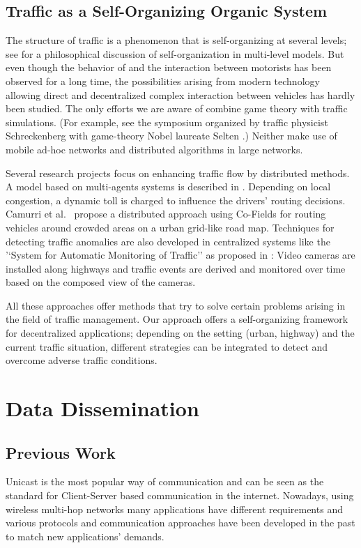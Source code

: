 \documentclass{acmrip}
\begin{document}
\subsection{Traffic as a Self-Organizing Organic System}

The structure of traffic is a phenomenon that is self-organizing at
several levels; see \cite{gh-wccsso-03} for a philosophical
discussion of self-organization in multi-level models. But even
though the behavior of and the interaction between motorists has
been observed for a long time, the possibilities arising from modern
technology allowing direct and decentralized complex interaction
between vehicles has hardly been studied. The only efforts we are
aware of combine game theory with traffic simulations. (For example,
see the symposium organized by traffic physicist Schreckenberg with
game-theory Nobel laureate Selten \cite{ss-hbtn-04}.) Neither make
use of mobile ad-hoc networks and distributed algorithms in large
networks.

Several research projects focus on enhancing traffic flow by distributed
methods. A model based on multi-agents systems is described in
\cite{1160653}. Depending on local congestion, a dynamic toll is charged to
influence the drivers' routing decisions. Camurri et al.~\cite{Camurri2006}
propose a distributed approach using Co-Fields for routing vehicles around
crowded areas on a urban grid-like road map. Techniques for detecting
traffic anomalies are also developed in centralized systems like the
'`System for Automatic Monitoring of Traffic'' as proposed in
\cite{Bandini2002}: Video cameras are installed along highways and traffic
events are derived and monitored over time based on the composed view of the
cameras.

All these approaches offer methods that try to solve certain problems arising
in the field of traffic management. Our approach offers a self-organizing
framework for decentralized applications; depending on the setting (urban,
highway) and the current traffic situation, different strategies can be
integrated to detect and overcome adverse traffic conditions.


\section{Data Dissemination}

\iffalse
\subsection{Previous Work}
Unicast is the most popular way of communication and can be seen as
the standard for Client-Server based communication in the internet.
Nowadays, using wireless multi-hop networks many applications have
different requirements and various protocols and communication
approaches have been developed in the past to match new
applications' demands.
\end{document}
